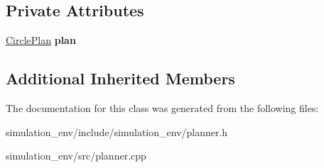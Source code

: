 \subsection*{Private Attributes}
\begin{DoxyCompactItemize}
\item 
\hyperlink{structCirclePlanner_1_1CirclePlan}{Circle\+Plan} {\bfseries plan}\hypertarget{classCirclePlanner_a69f9e183351ef2c5325eef292350fb52}{}\label{classCirclePlanner_a69f9e183351ef2c5325eef292350fb52}

\end{DoxyCompactItemize}
\subsection*{Additional Inherited Members}


The documentation for this class was generated from the following files\+:\begin{DoxyCompactItemize}
\item 
simulation\+\_\+env/include/simulation\+\_\+env/planner.\+h\item 
simulation\+\_\+env/src/planner.\+cpp\end{DoxyCompactItemize}
